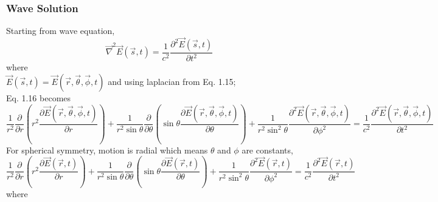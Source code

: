\subsubsection{Wave Solution}
Starting from wave equation,\\
\begin{equation}
\vec{\nabla}^2\vec{E}(\vec{s},t) =  \frac{1}{c^2}\frac{\partial^2\vec{E}(\vec{s},t)}{\partial t^2}
\end{equation}
where\\
$\vec{E}(\vec{s},t) = \vec{E}(\vec{r},\vec{\theta},\vec{\phi},t)$
and using laplacian from Eq. 1.15;\\
Eq. 1.16 becomes\\
\begin{equation}
\frac{1}{r^2}\frac{\partial}{\partial r}(r^2\frac{\partial\vec{E}(\vec{r},\vec{\theta},\vec{\phi},t) }{\partial r})+\frac{1}{r^2\sin\theta}\frac{\partial}{\partial\theta}(\sin\theta\frac{\partial \vec{E}(\vec{r},\vec{\theta},\vec{\phi},t)}{\partial \theta})+\frac{1}{r^2\sin^2\theta}\frac{\partial^2\vec{E}(\vec{r},\vec{\theta},\vec{\phi},t)}{\partial \phi^2} = \frac{1}{c^2}\frac{\partial^2\vec{E}(\vec{r},\vec{\theta},\vec{\phi},t)}{\partial t^2}
\end{equation}
For spherical symmetry, motion is radial which means $\theta$ and $\phi$ are constants,\\
\begin{equation}
\frac{1}{r^2}\frac{\partial}{\partial r}(r^2\frac{\partial\vec{E}(\vec{r},t) }{\partial r})+\frac{1}{r^2\sin\theta}\frac{\partial}{\partial\theta}(\sin\theta\frac{\partial \vec{E}(\vec{r},t)}{\partial \theta})+\frac{1}{r^2\sin^2\theta}\frac{\partial^2\vec{E}(\vec{r},t)}{\partial \phi^2} = \frac{1}{c^2}\frac{\partial^2\vec{E}(\vec{r},t)}{\partial t^2}
\end{equation}
where\\

